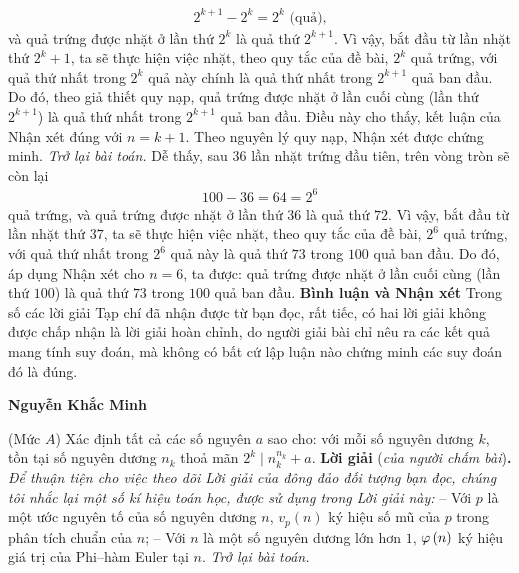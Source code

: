 \begin{multicols}{2}
	\begin{align*}
		{2^{k + 1}} - {2^k} = {2^k} \text{ (quả),}
	\end{align*}
	và quả trứng được nhặt ở lần thứ  $2^k$ là quả thứ $2^{k+1}$.
	\vskip 0.05cm 
	Vì vậy, bắt đầu từ lần nhặt thứ $2^k +1$,  ta sẽ thực hiện việc nhặt, theo quy tắc của đề bài, $2^k$  quả trứng, với quả thứ nhất trong $2^k$  quả này chính là quả thứ nhất trong $2^{k+1}$  quả ban đầu. Do đó, theo giả thiết quy nạp, quả trứng được nhặt ở lần cuối cùng (lần thứ  $2^{k+1}$) là quả thứ nhất trong $2^{k+1}$  quả ban đầu. Điều này cho thấy, kết luận của Nhận xét đúng với $n = k + 1$.
	\vskip 0.05cm
	Theo nguyên lý quy nạp, Nhận xét được chứng minh.
	\vskip 0.05cm
	\textit{Trở lại bài toán.}
	\vskip 0.05cm
	Dễ thấy, sau $36$ lần nhặt trứng đầu tiên, trên vòng tròn sẽ còn lại
	\begin{align*}
		100 - 36 = 64 = {2^6}
	\end{align*}
	quả trứng, và quả trứng được nhặt ở lần thứ $36$ là quả thứ $ 72$.
	\vskip 0.05cm
	Vì vậy, bắt đầu từ lần nhặt thứ $37$, ta sẽ thực hiện việc nhặt, theo quy tắc của đề bài, $2^6$  quả trứng, với quả thứ nhất trong $2^6$  quả này là quả thứ $73$ trong $100$ quả ban đầu. Do đó, áp dụng Nhận xét cho $n = 6$, ta được: quả trứng được nhặt ở lần cuối cùng (lần thứ $100$) là quả thứ $73$ trong $100$ quả ban đầu.
	\vskip 0.05cm
	\textbf{Bình luận và Nhận xét}
	\vskip 0.05cm
	Trong số các lời giải Tạp chí đã nhận được từ bạn đọc, rất tiếc, có hai lời giải không được chấp nhận là lời giải hoàn chỉnh, do người giải bài chỉ nêu ra các kết quả mang tính suy đoán, mà không có bất cứ lập luận nào chứng minh các suy đoán đó là đúng.
	\begin{flushright}
		\textbf{Nguyễn Khắc Minh}
	\end{flushright}
	{}
	(Mức $A$) Xác định tất cả các số nguyên $a$ sao cho: với mỗi số nguyên dương $k$, tồn tại số nguyên dương $n_k$ thoả mãn $2^k\mid n_k^{n_k}+a$. 
	\vskip 0.05cm
	\textbf{Lời giải} (\textit{của người chấm bài})\textbf{.}
	\vskip 0.05cm
	\textit{Để thuận tiện cho việc theo dõi Lời giải của đông đảo đối tượng bạn đọc, chúng tôi nhắc lại một số kí hiệu toán học, được sử dụng trong Lời giải này:}
	\vskip 0.05cm
	-- Với $p$ là một ước nguyên tố của số nguyên dương $n$, ${v_p}\left( n \right)$ ký hiệu số mũ của $p$ trong phân tích chuẩn của $n$;
	\vskip 0.05cm
	-- Với $n$ là một số nguyên dương lớn hơn $1$,  ${\rm{\varphi }}\left( n \right)$ ký hiệu giá trị của Phi--hàm Euler tại $n$.
	\vskip 0.05cm
	\textit{Trở lại bài toán.}

\end{multicols}

